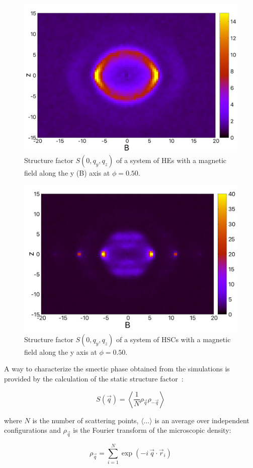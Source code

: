 \documentclass[aip,graphicx]{revtex4-1} %
\begin{document}
\begin{figure}
    \centering
    \includegraphics[width=0.5\columnwidth]{Syz_B_HE.png}
    \caption{Structure factor $S(0, q_y, q_z)$ of a system of HEs with a magnetic field along the y (B) axis at $\phi=0.50$.}\label{fig:Syz_B_HE}
\end{figure}

\begin{figure}
    \centering
    \includegraphics[width=0.5\columnwidth]{Syz_B.png}
    \caption{Structure factor $S(0, q_y, q_z)$ of a system of HSCs with a magnetic field along the y axis at $\phi=0.50$.}\label{fig:Syz_B_HSC}
\end{figure}

A way to characterize the smectic phase obtained from the simulations is provided by the calculation of the static structure factor~\cite{Hansen_McDonald}:

\begin{equation}\label{eq:S_q}
    S( \vec{q} ) = \left\langle \frac{1}{N} \rho_{\vec{q}} \rho_{-\vec{q}} \right\rangle 
\end{equation}

where $N$ is the number of scattering points, $\langle\ldots\rangle$ is an average over independent configurations and
$\rho_{\vec{q}}$ is the Fourier transform of the microscopic density:

\begin{equation}
    \rho_{\vec{q}} = \sum_{i=1}^N \exp(-i\, \vec{q} \cdot \vec{r}_i)
\end{equation}
\end{document}
